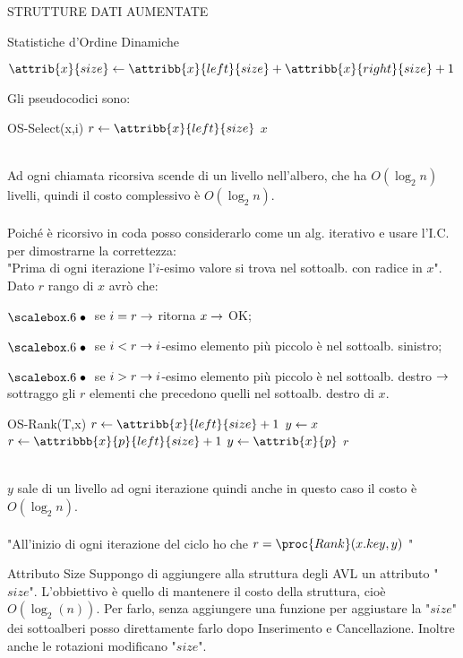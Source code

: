 \documentclass[8pt]{extarticle}
\begin{document}
\begin{formulario}
\begin{myParagraph}{STRUTTURE DATI AUMENTATE}
\begin{subParagraph}{Statistiche d'Ordine Dinamiche}
			\begin{tcenter}
			$\attrib{x}{size}\get\attribb{x}{left}{size}+\attribb{x}{right}{size}+1$
			\end{tcenter}
Gli pseudocodici sono:
			\begin{code}{OS-Select(x,i)}
\li $r\get \attribb{x}{left}{size}$
\li {}
	\li \RETURN $x$
\li {}
	\li \RETURN {}
\li \ELSE
\li \RETURN {}
\END
			\end{code}	
\\
Ad ogni chiamata ricorsiva scende di un livello nell'albero, che ha $O(\log_2 n)$ livelli, quindi il costo complessivo è $O(\log_2 n)$.\\
\\
Poiché è ricorsivo in coda posso considerarlo come un alg. iterativo e usare l'I.C. per dimostrarne la correttezza:\\
"Prima di ogni iterazione l'$i$-esimo valore si trova nel sottoalb. con radice in $x$".\\
Dato $r$ rango di $x$ avrò che:
			\begin{descr}{1}
				\item[$\scalare$] se $i=r \rightarrow$ ritorna $x\rightarrow$ OK;
				\item[$\scalare$] se $i<r \rightarrow i$-esimo elemento più piccolo è nel sottoalb. sinistro;  
				\item[$\scalare$] se $i>r \rightarrow i$-esimo elemento più piccolo è nel sottoalb. destro $\rightarrow$ sottraggo gli $r$ elementi che precedono quelli nel sottoalb. destro di $x$.
			\end{descr}
			\begin{code}{OS-Rank(T,x)}
\li $r\get\attribb{x}{left}{size}+1$
\li $y\leftarrow x$
\li {}
	\li {}
		\li $r\get\attribbb{x}{p}{left}{size}+1$
	\END
	\li $y\get\attrib{x}{p}$
\END
\li \RETURN $r$
			\end{code}
\\
$y$ sale di un livello ad ogni iterazione quindi anche in questo caso il costo è $O(\log_2 n)$.\\
\\
"All'inizio di ogni iterazione del ciclo ho che $r=\proc{Rank}(x.key,y)$ "
		\end{subParagraph}
		\begin{subParagraph}{Attributo Size}
Suppongo di aggiungere alla struttura degli AVL un attributo "$size$". L'obbiettivo è quello di mantenere il costo della struttura, cioè $O(\log_2(n))$. Per farlo, senza aggiungere una funzione per aggiustare la "$size$" dei sottoalberi posso direttamente farlo dopo Inserimento e Cancellazione. Inoltre anche le rotazioni modificano "$size$".

\end{subParagraph}
\end{myParagraph}
\end{formulario}
\end{document}
